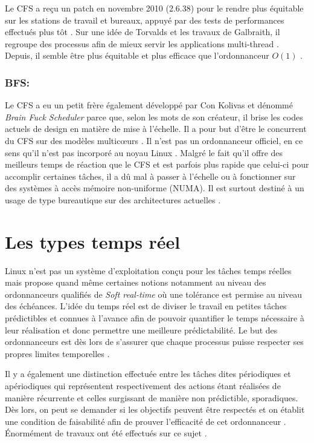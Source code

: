 \documentclass[letterpaper]{article}
\begin{document}
Le CFS a reçu un patch en novembre 2010 (2.6.38) pour le rendre plus équitable sur les stations de travail et bureaux, appuyé par des tests de performances effectués plus tôt \citep{7280991}. Sur une idée de Torvalds et les travaux de Galbraith, il regroupe des processus afin de mieux servir les applications multi-thread \citep{Wong:2008:TAF:1400097.1400102}. Depuis, il semble être plus équitable et plus efficace que l'ordonnanceur $O(1)$ \citep{4631872}.

\subsubsection{BFS:}

Le CFS a eu un petit frère également développé par Con Kolivas et dénommé \textit{Brain Fuck Scheduler} parce que, selon les mots de son créateur, il brise les codes actuels de design en matière de mise à l'échelle. Il a pour but d'être le concurrent du CFS sur des modèles multicœurs \citep{PATCHBFS}. Il n'est pas un ordonnanceur officiel, en ce sens qu'il n'est pas incorporé au noyau Linux \citep{opac-b1133216}. Malgré le fait qu'il offre des meilleurs temps de réaction que le CFS et est parfois plus rapide que celui-ci pour accomplir certaines tâches, il a dû mal à passer à l'échelle ou à fonctionner sur des systèmes à accès mémoire non-uniforme (NUMA). Il est surtout destiné à un usage de type bureautique sur des architectures actuelles \citep{CFSVSBFS}.

\section{Les types temps réel}

Linux n'est pas un système d'exploitation conçu pour les tâches temps réelles mais propose quand même certaines notions notamment au niveau des ordonnanceurs qualifiés de \textit{Soft real-time} où une tolérance est permise au niveau des échéances. L'idée du temps réel est de diviser le travail en petites tâches prédictibles et connues à l'avance afin de pouvoir quantifier le temps nécessaire à leur réalisation et donc permettre une meilleure prédictabilité. Le but des ordonnanceurs est dès lors de s'assurer que chaque processus puisse respecter ses propres limites temporelles \citep{stankovic2012deadline}.

Il y a également une distinction effectuée entre les tâches dites périodiques et apériodiques qui représentent respectivement des actions étant réalisées de manière récurrente et celles surgissant de manière non prédictible, sporadiques. Dès lors, on peut se demander si les objectifs peuvent être respectés et on établit une condition de faisabilité afin de prouver l'efficacité de cet ordonnanceur \citep{128746}. Énormément de travaux ont été effectués sur ce sujet \citep{Sha:2004:RTS:1028913.1028959}.
\end{document}
